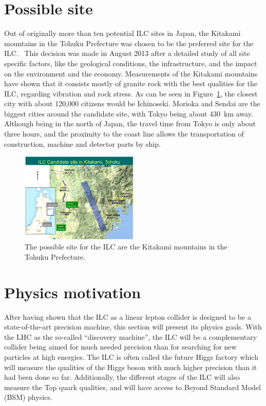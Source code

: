 \section{Possible site}
\label{ILC:site}
Out of originally more than ten potential ILC sites in Japan, the Kitakami mountains in the Tohuku Prefecture was chosen to be the preferred site for the ILC.~\cite{Site}
This decision was made in August 2013 after a detailed study of all site specific factors, like the geological conditions, the infrastructure, and the impact on the environment and the economy.
Measurements of the Kitakami mountains have shown that it consists mostly of granite rock with the best qualities for the ILC, regarding vibration and rock stress.
As can be seen in Figure~\ref{fig:ILC_Site}, the closest city with about 120,000 citizens would be Ichinoseki.
Morioka and Sendai are the biggest cities around the candidate site, with Tokyo being about \SI{430}{\kilo\meter} away.
Although being in the north of Japan, the travel time from Tokyo is only about three hours, and the proximity to the coast line allows the transportation of construction, machine and detector parts by ship.
\begin{figure}
\centering
\includegraphics[width=0.5\textwidth]{Figures/ILC-site.jpg}
\caption[Possible site for the ILC]{The possible site for the ILC are the Kitakami mountains in the Tohuku Prefecture.\cite{Kitakami}}
\label{fig:ILC_Site}
\end{figure}


\section{Physics motivation}
\label{ILC:physicsmotivation}
After having shown that the ILC as a linear lepton collider is designed to be a state-of-the-art precision machine, this section will present its physics goals.
With the LHC as the so-called ``discovery machine'', the ILC will be a complementary collider being aimed for much needed precision than for searching for new particles at high energies.
The ILC is often called the future Higgs factory which will measure the qualities of the Higgs boson with much higher precision than it had been done so far.
Additionally, the different stages of the ILC will also measure the Top quark qualities, and will have access to Beyond Standard Model (BSM) physics.
 
